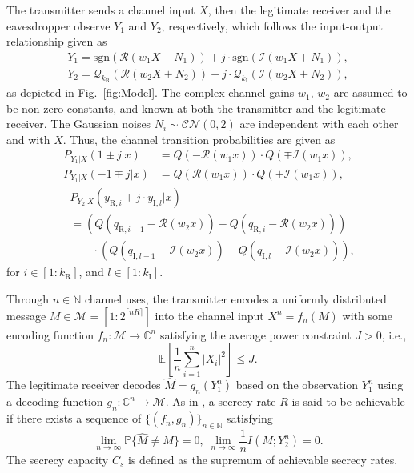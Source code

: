 \documentclass[journal]{IEEEtran}
\begin{document}
The transmitter sends a channel input $X$, then the legitimate receiver and the eavesdropper observe $Y_1$ and $Y_2$, respectively, which follows the input-output relationship given as 
\begin{multline}
    Y_1 = \textrm{sgn}(\mathcal{R}(w_1 X+N_1)) + j \cdot \textrm{sgn}(\mathcal{I}(w_1 X+N_1)),
\end{multline}
\begin{multline}
    Y_2 = \mathcal{Q}_{k_{\mathrm{R}}} (\mathcal{R}(w_2 X+N_2)) + j \cdot \mathcal{Q}_{k_{\mathrm{I}}} (\mathcal{I}(w_2 X+N_2)),
\end{multline}
as depicted in Fig.~\ref{fig:Model}.
The complex channel gains $w_1$, $w_2$ are assumed to be non-zero constants, and known at both the transmitter and the legitimate receiver. The Gaussian noises $N_i \sim \mathcal{CN}(0,2)$ are independent with each other and with $X$.
Thus, the channel transition probabilities are given as
\begin{align}
    P_{Y_1|X}( 1 \pm j|x) &= Q\left( - \mathcal{R}(w_1 x) \right) \cdot Q\left( \mp \mathcal{I}(w_1 x) \right), \label{eq:tran_p_11}
    \\ P_{Y_1|X}(- 1 \mp j|x) &= Q\left(  \mathcal{R}(w_1 x) \right) \cdot Q\left( \pm \mathcal{I}(w_1 x) \right),\label{eq:tran_p_12}
\end{align}
\begin{align}
    &P_{Y_2|X}(y_{\mathrm{R},i}+j\cdot y_{\mathrm{I},l}|x) \nonumber
    \\& =\left(Q\left( q_{\mathrm{R},i-1}-\mathcal{R}(w_2 x) \right) - Q\left( q_{\mathrm{R},i}-\mathcal{R}(w_2 x) \right) \right) \label{eq:tran_p_2}
    \\& \quad\quad \cdot \left(Q\left( q_{\mathrm{I},l-1}-\mathcal{I}(w_2 x) \right) - Q\left( q_{\mathrm{I},l}-\mathcal{I}(w_2 x) \right) \right), \nonumber
\end{align}
for $i \in [1:k_{\mathrm{R}}]$, and $l \in [1:k_{\mathrm{I}}]$.


Through $n \in \mathbb{N}$ channel uses, the transmitter encodes a uniformly distributed message $M \in \mathcal{M} = \left[ 1:2^{\lceil nR \rceil} \right]$ into the channel input $X^n=f_n (M)$ with some encoding function $f_n:\mathcal{M} \rightarrow \mathbb{C}^n$ satisfying the average power constraint $J>0$, i.e., 
\begin{equation}
    \mathbb{E}\left[\frac{1}{n}\sum_{i=1}^n |X_i|^2 \right] \leq J. \label{eq:powerconstraint}
\end{equation}
The legitimate receiver decodes  $\hat{M}=g_n(Y_1^n)$ based on the observation $Y_1^n$ using a decoding function $g_n:\mathbb{C}^n \rightarrow \mathcal{M}$.
As in \cite{wyner}, a secrecy rate $R$ is said to be achievable if there exists a sequence of $\{(f_n,g_n)\}_{n \in \mathbb{N}}$ satisfying
\begin{equation}
    \lim\limits_{n \rightarrow \infty} \mathbb{P} \{\hat{M} \neq M\}=0,\; \lim\limits_{n \rightarrow \infty}\frac{1}{n} I(M;Y_2^n) =0.
\end{equation}
The secrecy capacity $C_s$ is defined as the supremum of achievable secrecy rates.
\end{document}
